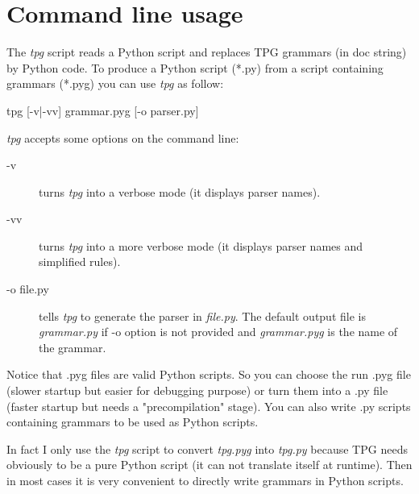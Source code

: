 \section{Command line usage}

The \emph{tpg} script reads a Python script and replaces TPG grammars (in doc string) by Python code.
To produce a Python script (*.py) from a script containing grammars (*.pyg) you can use \emph{tpg} as follow:

\begin{verbatimtab}[4]
    tpg [-v|-vv] grammar.pyg [-o parser.py]
\end{verbatimtab}

\emph{tpg} accepts some options on the command line:

\begin{description}
    \item [-v] turns \emph{tpg} into a verbose mode (it displays parser names).
    \item [-vv] turns \emph{tpg} into a more verbose mode (it displays parser names and simplified rules).
    \item [-o file.py] tells \emph{tpg} to generate the parser in \emph{file.py}. The default output file is \emph{grammar.py} if -o option is not provided and \emph{grammar.pyg} is the name of the grammar.
\end{description}

Notice that .pyg files are valid Python scripts. So you can choose the run .pyg file (slower startup but easier for debugging purpose) or turn them into a .py file (faster startup but needs a "precompilation" stage).
You can also write .py scripts containing grammars to be used as Python scripts.

In fact I only use the \emph{tpg} script to convert \emph{tpg.pyg} into \emph{tpg.py} because TPG needs obviously to be a pure Python script (it can not translate itself at runtime). Then in most cases it is very convenient to directly write grammars in Python scripts.

